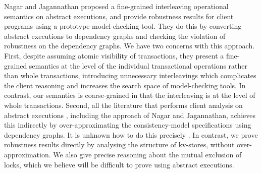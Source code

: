 {%

Nagar and Jagannathan \cite{sureshConcur} proposed a fine-grained 
interleaving operational semantics on abstract executions, and provide
robustness results for client programs using 
a prototype 
model-checking tool. 
They do this by converting abstract executions to
dependency graphs and checking the violation of robustness on the
dependency graphs. We have two concerns with this approach.  First, despite 
assuming atomic visibility of transactions, they present a fine-grained
semantics at the level of the individual transactional operations
rather than whole transactions, introducing unnecessary interleavings
which complicates the client reasoning and increases  the
search space of model-checking tools. 
In contrast, our semantics is coarse-grained in that the  interleaving is at the level of whole
transactions. 
Second, all the literature that performs client analysis
on abstract executions
\cite{giovanni_concur16,SIanalysis,psi-chopping,laws,sureshConcur},
including the approach of Nagar and Jagannathan,  achieves this indirectly by over-approximating
the consistency-model specifications using dependency graphs. 
It is  unknown how to do this precisely \cite{laws}. 
In contrast, we prove robustness results directly by
analysing the structure of kv-stores, without over-approximation. 
We also give precise reasoning about the mutual exclusion of locks,
which we believe will be difficult to prove using abstract executions.


}
